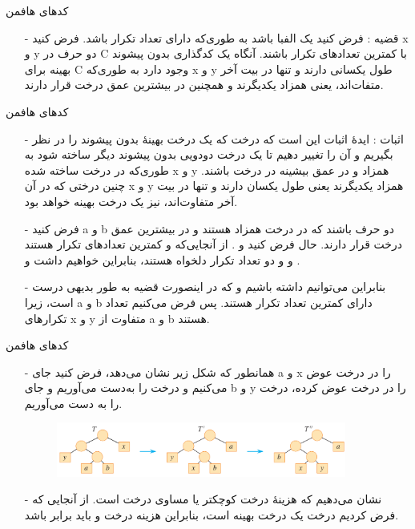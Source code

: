 \begin{frame}{‌کدهای هافمن}
\begin{itemize}\itemr
\item[-]
قضیه : فرض کنید
یک الفبا باشد به طوری‌که
دارای تعداد تکرار
باشد. فرض کنید x و y دو حرف در C با کمترین تعداد‌های تکرار باشند. آنگاه یک کدگذاری بدون پیشوند بهینه برای C وجود دارد به طوری‌که x و y طول یکسانی دارند و تنها در بیت آخر متفات‌اند، یعنی همزاد یکدیگرند و همچنین در بیشترین عمق درخت قرار دارند.
\end{itemize}
\end{frame}


\begin{frame}{‌کدهای هافمن}
\begin{itemize}\itemr
\item[-]
اثبات : ایدهٔ اثبات این است که درخت
که یک درخت بهینهٔ بدون پیشوند را در نظر بگیریم و آن را تغییر دهیم تا یک درخت دودویی بدون پیشوند دیگر ساخته شود به طوری‌که در درخت ساخته شده x و y همزاد
و در عمق بیشینه در درخت
باشند. چنین درختی که در آن x و y همزاد یکدیگرند یعنی طول یکسان دارند و تنها در بیت آخر متفاوت‌اند، نیز یک درخت بهینه خواهد بود.
\item[-]
فرض کنید a و b دو حرف باشند که در درخت
همزاد هستند و در بیشترین عمق درخت قرار دارند. حال فرض کنید
و
.
از آنجایی‌که
و
کمترین تعداد‌های تکرار هستند و
و
دو تعداد تکرار دلخواه هستند، بنابراین خواهیم داشت
و
.
\item[-]
بنابراین می‌توانیم داشته باشیم
و
که در اینصورت قضیه به طور بدیهی درست است، زیرا a و b دارای کمترین تعداد تکرار هستند.
 پس فرض می‌کنیم تعداد تکرارهای
 x 
 و
 y
 متفاوت از a و b هستند.
\end{itemize}
\end{frame}


\begin{frame}{‌کدهای هافمن}
\begin{itemize}\itemr
\item[-]
همانطور که شکل زیر نشان می‌دهد، فرض کنید جای a و x را در درخت
عوض می‌کنیم و درخت
را به‌دست می‌آوریم و جای b و y را در درخت 
عوض کرده،
درخت
را به دست می‌آوریم.
\begin{figure}
\includegraphics[width=0.9\textwidth]{figs/chap05/huffman-proof}
\end{figure}
\item[-]
نشان می‌دهیم که هزینهٔ درخت
کوچکتر یا مساوی درخت
 است.
 از آنجایی که فرض کردیم درخت 
 یک درخت بهینه است، بنابراین هزینه درخت 
 و
باید برابر باشد.
\end{itemize}
\end{frame}


